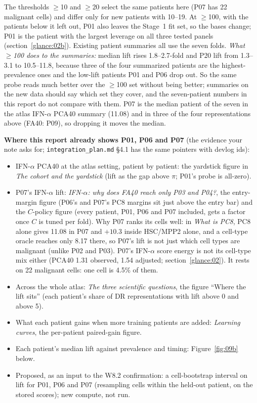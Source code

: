 The thresholds $\geq$10 and $\geq$20 select the same patients here (P07 has 22 malignant cells) and differ only for new patients with 10--19. At $\geq$100, with the patients below it left out, P01 also leaves the Stage~1 fit set, so the bases change; P01 is the patient with the largest leverage on all three tested panels (section~\ref{glance:02b}). Existing patient summaries all use the seven folds. \emph{What $\geq$100 does to the summaries:} median lift rises 1.8--2.7-fold and P20 lift from 1.3--3.1 to 10.5--11.8\pp, because three of the four summarized patients are the highest-prevalence ones and the low-lift patients P01 and P06 drop out. So the same probe reads much better over the $\geq$100 set without being better; summaries on the new data should say which set they cover, and the seven-patient numbers in this report do not compare with them. P07 is the median patient of the seven in the atlas IFN-$\alpha$ PCA40 summary (11.08\pp) and in three of the four representations above (FA40: P09), so dropping it moves the median.

\textbf{Where this report already shows P01, P06 and P07} (the evidence your note asks for; \texttt{integration\_plan.md} \S4.1 has the same pointers with devlog ids):
\begin{itemize}[leftmargin=1.4em]
\item IFN-$\alpha$ PCA40 at the atlas setting, patient by patient: the yardstick figure in \emph{The cohort and the yardstick} (lift as the gap above $\pi$; P01's probe is all-zero).
\item P07's IFN-$\alpha$ lift: \emph{IFN-$\alpha$: why does FA40 reach only P03 and P04?}, the entry-margin figure (P06's and P07's PC8 margins sit just above the entry bar) and the $C$-policy figure (every patient, P01, P06 and P07 included, gets a factor once $C$ is tuned per fold). Why P07 ranks its cells well: in \emph{What is PC8}, PC8 alone gives 11.08\pp{} in P07 and $+10.3$\pp{} inside HSC/MPP2 alone, and a cell-type oracle reaches only 8.17\pp{} there, so P07's lift is not just which cell types are malignant (unlike P02 and P03). P07's IFN-$\alpha$ score energy is not its cell-type mix either (PCA40 1.31 observed, 1.54 adjusted; section~\ref{glance:02}). It rests on 22 malignant cells: one cell is 4.5\% of them.
\item Across the whole atlas: \emph{The three scientific questions}, the figure ``Where the lift sits'' (each patient's share of DR representations with lift above 0 and above 5\pp).
\item What each patient gains when more training patients are added: \emph{Learning curves}, the per-patient paired-gain figure.
\item Each patient's median lift against prevalence and timing: Figure~\ref{fig:09b} below.
\item Proposed, as an input to the W8.2 confirmation: a cell-bootstrap interval on lift for P01, P06 and P07 (resampling cells within the held-out patient, on the stored scores); new compute, not run.
\end{itemize}

